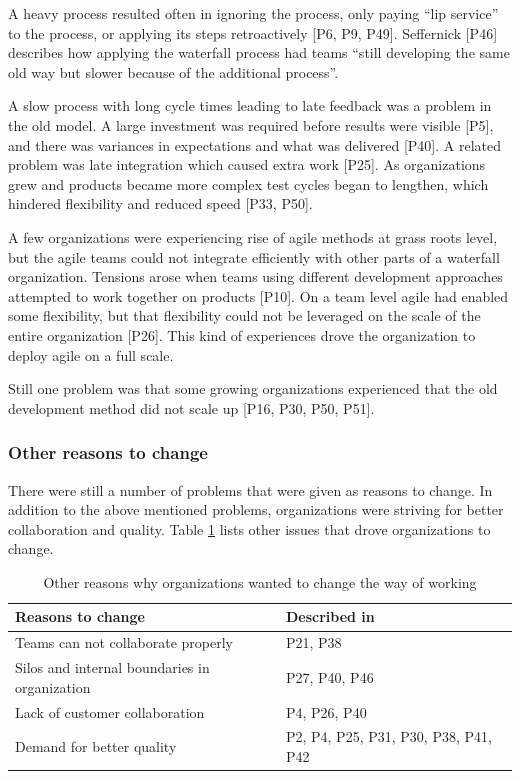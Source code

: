 A heavy process resulted often in ignoring the process, only paying ``lip
service'' to the process, or applying its steps retroactively [P6, P9, P49].
Seffernick [P46] describes how applying the waterfall process had teams ``still
developing the same old way but slower because of the additional process''.

A slow process with long cycle times leading to late feedback was a problem in
the old model. A large investment was required before results were visible [P5],
and there was variances in expectations and what was delivered [P40]. A related
problem was late integration which caused extra work [P25]. As organizations
grew and products became more complex test cycles began to lengthen, which
hindered flexibility and reduced speed [P33, P50].

A few organizations were experiencing rise of agile methods at grass roots
level, but the agile teams could not integrate efficiently with other parts of
a waterfall organization. Tensions arose when teams using different development
approaches attempted to work together on products [P10]. On a team level agile
had enabled some flexibility, but that flexibility could not be leveraged on the
scale of the entire organization [P26].
This kind of experiences drove the organization to deploy agile on a full scale.

Still one problem was that some growing organizations experienced that the old
development method did not scale up [P16, P30, P50, P51].


\subsubsection{Other reasons to change}

There were still a number of problems that were given as reasons to change.
In addition to the above mentioned problems, organizations were striving for
better collaboration and quality. Table \ref{table:reasonstochange_other} lists
other issues that drove organizations to change.

\begin{table}[b]
    \centering
    \begin{tabular}{ >{\raggedright\arraybackslash}p{}
                     >{\raggedright\arraybackslash}p{} }
        \toprule
        Reasons to change           &  Described in  \\
        \midrule
        Teams can not collaborate properly   &  P21, P38  \\
        Silos and internal boundaries in organization   &  P27, P40, P46  \\
        Lack of customer collaboration       &  P4, P26, P40  \\
        Demand for better quality            &  P2, P4, P25, P31, P30, P38, P41, P42  \\
        \bottomrule
    \end{tabular}
    \caption{Other reasons why organizations wanted to change the way of working}
    \label{table:reasonstochange_other}
\end{table}

